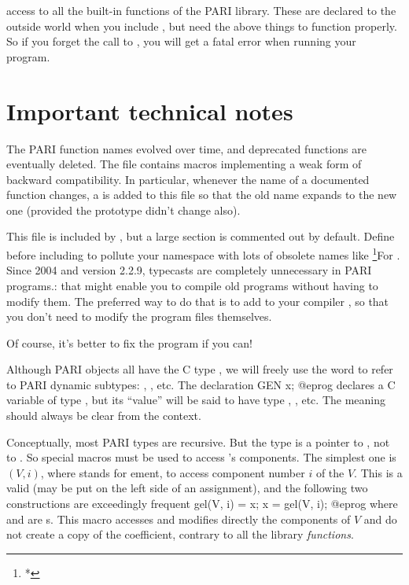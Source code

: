 \item access to all the built-in functions of the PARI library.
These are declared to the outside world when you include , but
need the above things to function properly. So if you forget the call to
, you will get a fatal error when running your program.

\section{Important technical notes}

 The PARI function names evolved over time,
and deprecated functions are eventually deleted.  The file 
contains macros implementing a weak form of backward compatibility.
In particular, whenever the name of a documented function changes, a
 is added to this file so that the old name expands to the new
one (provided the prototype didn't change also).

This file is included by , but a large section is commented out
by default. Define  before including  to
pollute your namespace with lots of obsolete names like
\footnote{*}{For . Since 2004 and version 2.2.9,
typecasts are completely unnecessary in PARI programs.}: that might enable
you to compile old programs without having to modify them. The preferred way
to do that is to add  to your compiler ,
so that you don't need to modify the program files themselves.

Of course, it's better to fix the program if you can!


\noindent
Although PARI objects all have the C type , we will freely use
the word  to refer to PARI dynamic subtypes: , ,
etc. The declaration
\bprog
  GEN x;
@eprog\noindent
declares a C variable of type , but its ``value'' will be said to
have type , , etc. The meaning should always be clear from
the context.


\noindent
Conceptually, most PARI types are recursive. But the  type is a
pointer to , not to . So special macros must be used to
access 's components. The simplest one is $(V, i)$, where
 stands for ement, to access component number $i$ of the
 $V$. This is a valid  (may be put on the left side of
an assignment), and the following two constructions are exceedingly frequent
%
\bprog
  gel(V, i) = x;
  x = gel(V, i);
@eprog\noindent
where  and  are s. This macro accesses and modifies
directly the components of $V$ and do not create a copy of the coefficient,
contrary to all the library \emph{functions}.


